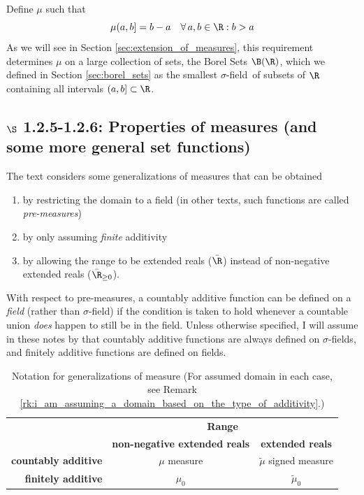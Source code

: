 \documentclass{article} %
\renewcommand{\sf}{$\sigma$-field}
\newcommand{\sfs}{$\sigma$-fields}
\begin{document}
\begin{example}{}
Define $\mu$ such that 
\[ \mu(a,b] = b-a \quad \forall \, a,b \in \R : b>a \]
As we will see in Section \ref{sec:extension_of_measures}, this requirement determines $\mu$ on a large collection of sets, the Borel Sets $\B(\R)$, which we defined in Section \ref{sec:borel_sets} as the smallest \sf\ of subsets of $\R$ containing all intervals $(a,b] \subset \R$. 
\label{ex:Lebesgue_measure}
\end{example}


\subsection{$\S$ 1.2.5-1.2.6: Properties of measures (and some more general set functions)}

The text considers some generalizations of measures that can be obtained
\begin{enumerate}
\item  by restricting the domain to a field {\footnotesize (in other texts, such functions are called \textit{pre-measures}) }
\item  by only assuming \textit{finite} additivity 
\item by allowing the range to be extended reals ($\bar{\R}$) instead of non-negative extended reals ($\bar{\R}_{\geq 0}$).  
\end{enumerate}



\begin{remark}
With respect to pre-measures, a countably additive function can be defined on a \textit{field} (rather than \sf) if the condition is taken to hold whenever a countable union \textit{does} happen to still be in the field.  Unless otherwise specified, I will assume in these notes by that countably additive functions are always defined on \sfs, and finitely additive functions are defined on fields.
\label{rk:i_am_assuming_a_domain_based_on_the_type_of_additivity}
\end{remark}	



\begin{table}[!h]
\centering	
\begin{tabular}{rcc}
&\multicolumn{2}{c}{\textbf{Range}} \\
& \textbf{non-negative extended reals} & \textbf{extended reals} \\
\textbf{countably additive}& $\mu$ measure  & $\tilde{\mu}$ signed measure \\
\textbf{finitely additive}& $\mu_0$ & $\tilde{\mu}_0$ \\	
\end{tabular}
\caption{Notation for generalizations of measure (For assumed domain in each case, see Remark \ref{rk:i_am_assuming_a_domain_based_on_the_type_of_additivity}.)}
\label{tab:notation_for_generalizations_of_measure}
\end{table}
\end{document}
